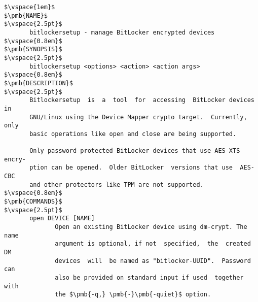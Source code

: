 \begin{lstlisting}[frame=none, escapechar=$, columns=fullflexible, keepspaces=true, basicstyle=\ttfamily\small]
$\vspace{1em}$
$\pmb{NAME}$
$\vspace{2.5pt}$
       bitlockersetup - manage BitLocker encrypted devices
$\vspace{0.8em}$
$\pmb{SYNOPSIS}$
$\vspace{2.5pt}$
       bitlockersetup <options> <action> <action args>
$\vspace{0.8em}$
$\pmb{DESCRIPTION}$
$\vspace{2.5pt}$
       Bitlockersetup  is  a  tool  for  accessing  BitLocker devices in
       GNU/Linux using the Device Mapper crypto target.  Currently, only
       basic operations like open and close are being supported.

       Only password protected BitLocker devices that use AES-XTS encry-
       ption can be opened.  Older BitLocker  versions that use  AES-CBC
       and other protectors like TPM are not supported.
$\vspace{0.8em}$
$\pmb{COMMANDS}$
$\vspace{2.5pt}$
       open DEVICE [NAME]
              Open an existing BitLocker device using dm-crypt. The name
              argument is optional, if not  specified,  the  created  DM
              devices  will  be named as "bitlocker-UUID".  Password can
              also be provided on standard input if used  together  with
              the $\pmb{-q,} \pmb{-}\pmb{-quiet}$ option.


\end{lstlisting}
